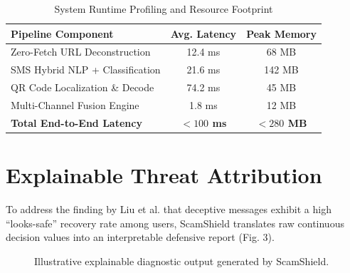 \documentclass[conference]{IEEEtran}
\begin{document}
\begin{table}[htbp]
\caption{System Runtime Profiling and Resource Footprint}
\begin{center}
\begin{tabular}{lcc}
\toprule
\textbf{Pipeline Component} & \textbf{Avg. Latency} & \textbf{Peak Memory} \\
\midrule
Zero-Fetch URL Deconstruction & 12.4 ms & 68 MB \\
SMS Hybrid NLP + Classification & 21.6 ms & 142 MB \\
QR Code Localization \& Decode & 74.2 ms & 45 MB \\
Multi-Channel Fusion Engine & 1.8 ms & 12 MB \\
\midrule
\textbf{Total End-to-End Latency} & \textbf{$<100$ ms} & \textbf{$<280$ MB} \\
\bottomrule
\end{tabular}
\label{tab:runtime_perf}
\end{center}
\end{table}

\section{Explainable Threat Attribution}
To address the finding by Liu et al. \cite{liu2021detecting} that deceptive messages exhibit a high ``looks-safe'' recovery rate among users, ScamShield translates raw continuous decision values into an interpretable defensive report (Fig. 3).

\begin{figure}[htbp]
\centerline{}
\caption{Illustrative explainable diagnostic output generated by ScamShield.}
\label{fig:explainability}
\end{figure}
\end{document}
